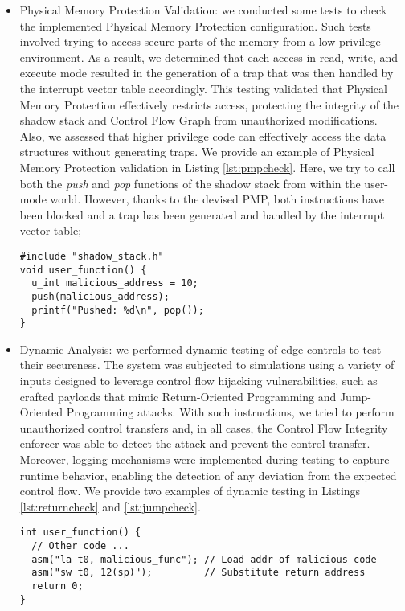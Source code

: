 \begin{itemize}
  \item Physical Memory Protection Validation: we conducted some tests to check
    the implemented Physical Memory Protection configuration. Such tests involved
    trying to access secure parts of the memory from a low-privilege environment.
    As a result, we determined that each access in read, write, and execute mode
    resulted in the generation of a trap that was then handled by the interrupt vector
    table accordingly. This testing validated that Physical Memory Protection
    effectively restricts access, protecting the integrity of the shadow stack and
    Control Flow Graph from unauthorized modifications. Also, we assessed that higher
    privilege code can effectively access the data structures without generating
    traps. We provide an example of Physical Memory Protection validation in
    Listing \ref{lst:pmpcheck}. Here, we try to call both the \textit{push} and \textit{pop}
    functions of the shadow stack from within the user-mode world. However,
    thanks to the devised PMP, both instructions have been blocked and a trap has
    been generated and handled by the interrupt vector table;

    \begin{lstlisting}[style=CStyle, caption = Physical Memory Protection testing, label={lst:pmpcheck}]
#include "shadow_stack.h"
void user_function() {
  u_int malicious_address = 10;
  push(malicious_address);
  printf("Pushed: %d\n", pop());
}
 \end{lstlisting}

  \item Dynamic Analysis: we performed dynamic testing of edge controls to test
    their secureness. The system was subjected to simulations using a variety of
    inputs designed to leverage control flow hijacking vulnerabilities, such as
    crafted payloads that mimic Return-Oriented Programming and Jump-Oriented
    Programming attacks. With such instructions, we tried to perform
    unauthorized control transfers and, in all cases, the Control Flow Integrity
    enforcer was able to detect the attack and prevent the control transfer. Moreover,
    logging mechanisms were implemented during testing to capture runtime
    behavior, enabling the detection of any deviation from the expected control flow.
    We provide two examples of dynamic testing in Listings \ref{lst:returncheck}
    and \ref{lst:jumpcheck}.

    \begin{lstlisting}[style=CStyle, caption = Return-Oriented Programming simulation attack, label={lst:returncheck}]
int user_function() {
  // Other code ...
  asm("la t0, malicious_func"); // Load addr of malicious code
  asm("sw t0, 12(sp)");         // Substitute return address
  return 0;
}
       \end{lstlisting}


\end{itemize}

